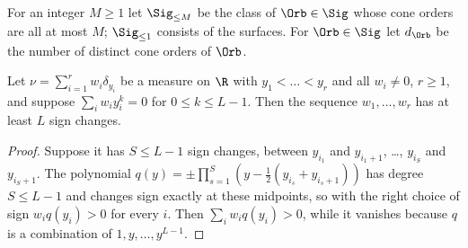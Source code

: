 
For an integer $M\ge1$ let $\Sig_{\le M}$ be the class of $\Orb\in\Sig$ whose cone orders are all at most $M$; $\Sig_{\le1}$ consists of the surfaces. For $\Orb\in\Sig$ let $d_\Orb$ be the number of distinct cone orders of $\Orb$.

\begin{lemma}\label{msep:signs}
Let $\nu=\sum_{i=1}^rw_i\delta_{y_i}$ be a measure on $\R$ with $y_1<\dots<y_r$ and all $w_i\ne0$, $r\ge1$, and suppose $\sum_iw_iy_i^k=0$ for $0\le k\le L-1$. Then the sequence $w_1,\dots,w_r$ has at least $L$ sign changes.
\end{lemma}

\begin{proof}
Suppose it has $S\le L-1$ sign changes, between $y_{i_1}$ and $y_{i_1+1}$, \dots, $y_{i_S}$ and $y_{i_S+1}$. The polynomial $q(y)=\pm\prod_{s=1}^S(y-\frac12(y_{i_s}+y_{i_s+1}))$ has degree $S\le L-1$ and changes sign exactly at these midpoints, so with the right choice of sign $w_iq(y_i)>0$ for every $i$. Then $\sum_iw_iq(y_i)>0$, while it vanishes because $q$ is a combination of $1,y,\dots,y^{L-1}$.
\end{proof}

